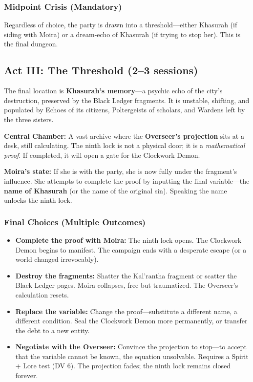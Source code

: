 \documentclass[11pt]{article}
\begin{document}
\subsubsection{Midpoint Crisis (Mandatory)}

Regardless of choice, the party is drawn into a threshold---either Khasurah (if siding with Moira) or a dream-echo of Khasurah (if trying to stop her). This is the final dungeon.

\subsection{Act III: The Threshold (2--3 sessions)}

The final location is \textbf{Khasurah's memory}---a psychic echo of the city's destruction, preserved by the Black Ledger fragments. It is unstable, shifting, and populated by Echoes of its citizens, Poltergeists of scholars, and Wardens left by the three sisters.

\textbf{Central Chamber:} A vast archive where the \textbf{Overseer's projection} sits at a desk, still calculating. The ninth lock is not a physical door; it is a \textit{mathematical proof}. If completed, it will open a gate for the Clockwork Demon.

\textbf{Moira's state:} If she is with the party, she is now fully under the fragment's influence. She attempts to complete the proof by inputting the final variable---the \textbf{name of Khasurah} (or the name of the original sin). Speaking the name unlocks the ninth lock.

\subsubsection{Final Choices (Multiple Outcomes)}

\begin{itemize}
    \item \textbf{Complete the proof with Moira:} The ninth lock opens. The Clockwork Demon begins to manifest. The campaign ends with a desperate escape (or a world changed irrevocably).
    \item \textbf{Destroy the fragments:} Shatter the Kal'rantha fragment or scatter the Black Ledger pages. Moira collapses, free but traumatized. The Overseer's calculation resets.
    \item \textbf{Replace the variable:} Change the proof---substitute a different name, a different condition. Seal the Clockwork Demon more permanently, or transfer the debt to a new entity.
    \item \textbf{Negotiate with the Overseer:} Convince the projection to stop---to accept that the variable cannot be known, the equation unsolvable. Requires a Spirit + Lore test (DV 6). The projection fades; the ninth lock remains closed forever.
\end{itemize}
\end{document}
